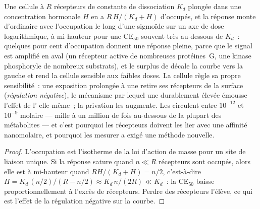 \begin{proposition}\label{prop:b3:endocrinology:dose}
Une cellule à $R$ récepteurs de constante de dissociation $K_{d}$
plongée dans une concentration hormonale $H$ en a $R\,H/(K_{d} + H)$
d'occupés, et la réponse monte d'ordinaire avec l'occupation le long
d'une sigmoïde sur un axe de dose logarithmique, à mi-hauteur pour une
$\text{CE}_{50}$ souvent très au-dessous de $K_{d}$~: quelques pour cent
d'occupation donnent une réponse pleine, parce que le signal est
amplifié en aval (un récepteur active de nombreuses protéines~G, une
kinase phosphoryle de nombreux substrats), et le surplus de
\emph{} décale la courbe vers la gauche et rend la
cellule sensible aux faibles doses. La cellule règle sa propre
sensibilité~: une exposition prolongée à une  retire ses
récepteurs de la surface (\emph{régulation négative}), le mécanisme par
lequel une  durablement élevée émousse l'effet de l'
elle-même~; la privation les augmente. Les  circulent entre
$10^{-12}$ et $10^{-9}$ molaire --- mille à un million de fois
au-dessous de la plupart des métabolites --- et c'est pourquoi les
récepteurs doivent les lier avec une affinité nanomolaire, et pourquoi
les mesurer a exigé une méthode nouvelle.
\end{proposition}
\begin{proof}
L'occupation est l'isotherme de la loi d'action de masse pour un site de
liaison unique. Si la réponse sature quand $n \ll R$ récepteurs sont
occupés, alors elle est à mi-hauteur quand $R H/(K_{d} + H) = n/2$,
c'est-à-dire $H = K_{d}\,
(n/2)/(R - n/2) \approx K_{d}\, n/(2R) \ll K_{d}$~: la CE$_{50}$ baisse
proportionnellement à l'excès de récepteurs. Perdre des récepteurs
l'élève, ce qui est l'effet de la régulation négative sur la courbe.
\end{proof}

